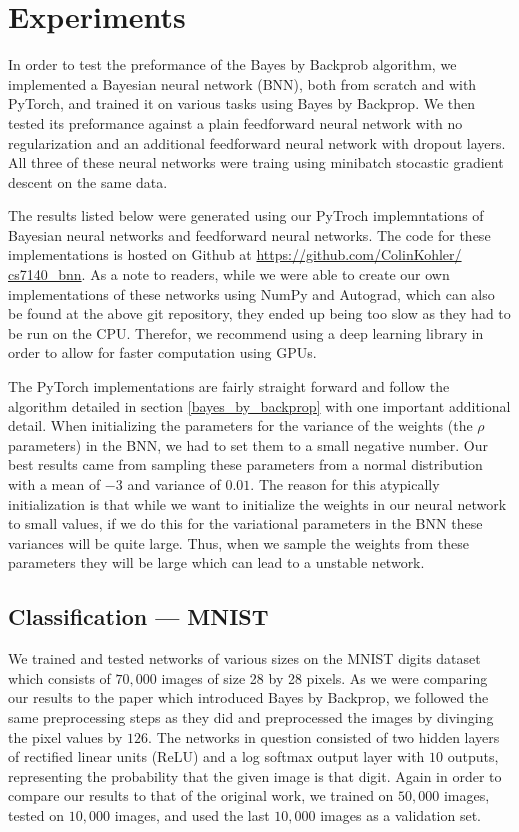 \documentclass[11pt]{article}
\begin{document}
\section{Experiments}
In order to test the preformance of the Bayes by Backprob algorithm, we
implemented a Bayesian neural network (BNN), both from scratch and with PyTorch,
and trained it on various tasks using Bayes by Backprop. We then tested its
preformance against a plain feedforward neural network with no regularization
and an additional feedforward neural network with dropout layers. All three
of these neural networks were traing using minibatch stocastic gradient descent
on the same data.

The results listed below were generated using our PyTroch implemntations of 
Bayesian neural networks and feedforward neural networks. The code for these
implementations is hosted on Github at \url{https://github.com/ColinKohler/
cs7140_bnn}. As a note to readers, while we were able to create our own 
implementations of these networks using NumPy and Autograd, which can also
be found at the above git repository, they ended up being too slow as they had
to be run on the CPU. Therefor, we recommend using a deep learning library in
order to allow for faster computation using GPUs. 

The PyTorch implementations are fairly straight forward and follow the 
algorithm detailed in section \ref{bayes_by_backprop} with one important 
additional detail. When initializing the parameters for the variance of the 
weights (the $\rho$ parameters) in the BNN, we had to set them to a small
negative number. Our best results came from sampling these parameters from
a normal distribution with a mean of $-3$ and variance of $0.01$. The reason
for this atypically initialization is that while we want to initialize the
weights in our neural network to small values, if we do this for the 
variational parameters in the BNN these variances will be quite large. Thus,
when we sample the weights from these parameters they will be large which can
lead to a unstable network.

\subsection{Classification --- MNIST}
We trained and tested networks of various sizes on the MNIST digits
dataset\cite{} which consists of $70,000$ images of size 28 by 28 pixels.
As we were comparing our results to the paper which introduced Bayes by 
Backprop, we followed the same preprocessing steps as they did and 
preprocessed the images by divinging the pixel values by $126$. The networks
in question consisted of two hidden layers of rectified linear units (ReLU)
and a log softmax output layer with $10$ outputs, representing the probability
that the given image is that digit. Again in order to compare our results to
that of the original work, we trained on $50,000$ images, tested on
$10,000$ images, and used the last $10,000$ images as a validation set.
\end{document}
